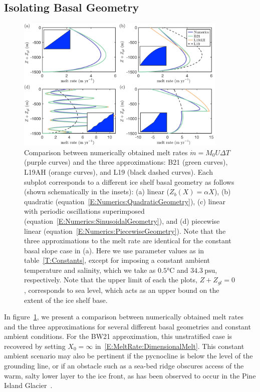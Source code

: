 \documentclass{jfm}
\begin{document}
\subsection{Isolating Basal Geometry}\label{S:Numerics:NoPycnocline}
\begin{figure}
\centering
\includegraphics[width = 0.9\textwidth]{fig6_isolating_geometry}
\caption{Comparison between numerically obtained melt rates $\dot{m}= M_0 U \Delta T$ (purple curves) and the three approximations: B21 (green curves), L19AH (orange curves), and L19 (black dashed curves). Each subplot corresponds to a different ice shelf basal geometry as follows (shown schematically in the insets): (a) linear ($Z_b(X) = \alpha X$), (b) quadratic (equation~\eqref{E:Numerics:QuadraticGeometry}), (c) linear with periodic oscillations superimposed (equation~\eqref{E:Numerics:SinusoidalGeometry}), and (d) piecewise linear (equation~\eqref{E:Numerics:PiecewiseGeometry}). Note that the three approximations to the melt rate are identical for the constant basal slope case in (a).  Here we use parameter values as in table~\ref{T:Constants}, except for imposing a constant ambient temperature and salinity, which we take as $ 0.5\si{\celsius}$ and $34.3~\text{psu}$, respectively. Note that the upper limit of each the plots, $Z + Z_{gl} = 0$, corresponds to sea level, which acts as an upper bound on the extent of the ice shelf base.}   \label{fig:Numerics:Geometry}
\end{figure}

In figure~\ref{fig:Numerics:Geometry}, we present a comparison between numerically obtained melt rates and the three approximations for several different basal geometries and constant ambient conditions. For the BW21 approximation, this unstratified case is recovered by setting $X_0 = \infty$ in~\eqref{E:MeltRate:DimensionalMelt}. This constant ambient scenario may also be pertinent if the pycnocline is below the level of the grounding line, or if an obstacle such as a sea-bed ridge obscures access of the warm, salty lower layer to the ice front, as has been observed to occur in the Pine Island Glacier~\citep{DeRydt2014JGeophysResOceans}. 
\end{document}
